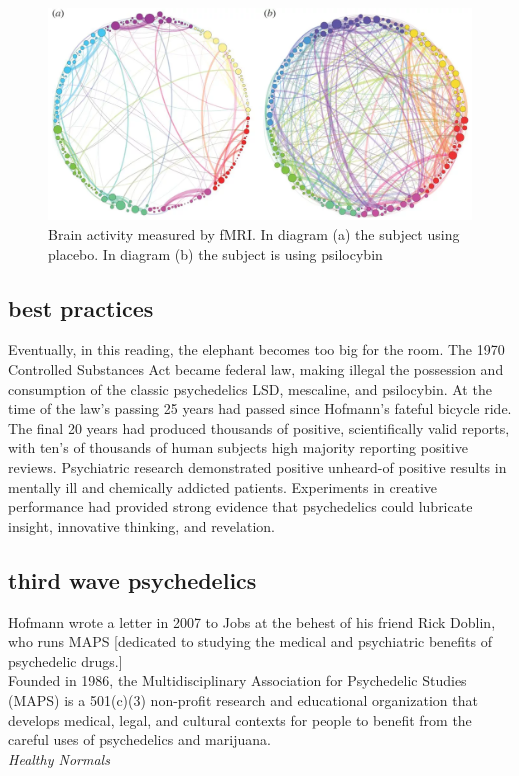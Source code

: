 \documentclass{UIdahoMastersThesis}
\begin{document}
\begin{figure}[h!]
	\centering
	\includegraphics[width=\linewidth]{dmn.png}
	\caption{Brain activity measured by fMRI. In diagram (a) the subject using placebo. In diagram (b) the subject is using psilocybin}
	\label{fig:dmn}
\end{figure}

\subsection{best practices}

Eventually, in this reading, the elephant becomes too big for the room. The 1970 Controlled Substances Act became federal law, making illegal the possession and consumption of the classic psychedelics LSD, mescaline, and psilocybin. At the time of the law's passing 25 years had passed since Hofmann's fateful bicycle ride. The final 20 years had produced thousands of positive, scientifically valid reports, with ten's of thousands of human subjects high majority reporting positive reviews. Psychiatric research demonstrated positive unheard-of positive results in mentally ill and chemically addicted patients. Experiments in creative performance had provided strong evidence that psychedelics could lubricate insight, innovative thinking, and revelation.  

\subsection{third wave psychedelics}

\begin{snugshade*}
{Hofmann wrote a letter in 2007 to Jobs at the behest of his friend Rick Doblin, who runs MAPS [dedicated to studying the medical and psychiatric benefits of psychedelic drugs.]\\
Founded in 1986, the Multidisciplinary Association for Psychedelic Studies (MAPS) is a 501(c)(3) non-profit research and educational organization that develops medical, legal, and cultural contexts for people to benefit from the careful uses of psychedelics and marijuana.}\\
\emph{Healthy Normals}
\end{snugshade*}
\end{document}
